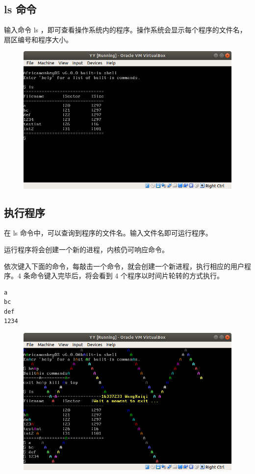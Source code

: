 \documentclass{article}
\begin{document}
\subsection{ls 命令}

输入命令 ls ，即可查看操作系统内的程序。操作系统会显示每个程序的文件名，扇区编号和程序大小。

\begin{figure}[!hbp]
	\centering
	\includegraphics[scale=0.5]{pics/4.png}
\end{figure}

\newpage

\subsection{执行程序}

在 ls 命令中，可以查询到程序的文件名。输入文件名即可运行程序。

运行程序将会创建一个新的进程，内核仍可响应命令。

依次键入下面的命令，每敲击一个命令，就会创建一个新进程，执行相应的用户程序。4 条命令键入完毕后，将会看到 4 个程序以时间片轮转的方式执行。

\begin{lstlisting}
a
bc
def
1234
\end{lstlisting}

\begin{figure}[!hbp]
	\centering
	\includegraphics[scale=0.5]{pics/5.png}
\end{figure}
\end{document}
